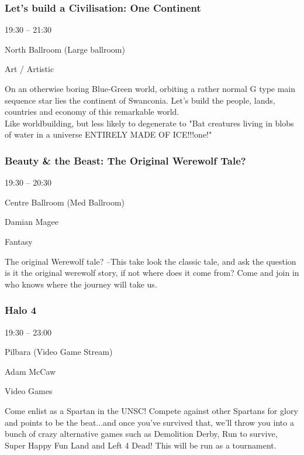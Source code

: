 \documentclass{scrreprt}
\begin{document}
\begin{multicols}{2}
\subsubsection*{Let's build a Civilisation: One Continent}\begin{description}
\setlength{\itemsep}{0pt}
\setlength{\parsep}{0pt}
\setlength{\parskip}{0pt}
\item[Time:]{19:30 -- 21:30}
\item[Venue:]{North Ballroom (Large ballroom)}
\item[Tags:]{Art / Artistic}\end{description}
On an otherwise boring Blue-Green world, orbiting a rather normal G type main sequence star lies the continent of Swanconia. Let's build the people, lands, countries and economy of this remarkable world.\\Like worldbuilding, but less likely to degenerate to "Bat creatures living in blobs of water in a universe ENTIRELY MADE OF ICE!!!one!"
\subsubsection*{Beauty \& the Beast: The Original Werewolf Tale?}\begin{description}
\setlength{\itemsep}{0pt}
\setlength{\parsep}{0pt}
\setlength{\parskip}{0pt}
\item[Time:]{19:30 -- 20:30}
\item[Venue:]{Centre Ballroom (Med Ballroom)}
\item[People:]{Damian Magee}
\item[Tags:]{Fantasy}\end{description}
The original Werewolf tale? –This take look the classic tale, and ask the question is it the original werewolf story, if not where does it come from?  Come and join in who knows where the journey will take us.
\subsubsection*{Halo 4}\begin{description}
\setlength{\itemsep}{0pt}
\setlength{\parsep}{0pt}
\setlength{\parskip}{0pt}
\item[Time:]{19:30 -- 23:00}
\item[Venue:]{Pilbara (Video Game Stream)}
\item[People:]{Adam McCaw}
\item[Tags:]{Video Games}\end{description}
Come enlist as a Spartan in the UNSC! Compete against other Spartans for glory and points to be the beat...and once you've survived that, we'll throw you into a bunch of crazy alternative games such as Demolition Derby, Run to survive, Super Happy Fun Land and Left 4 Dead! This will be run as a tournament.

\end{multicols}
\end{document}
